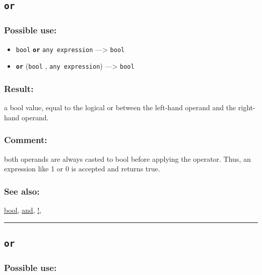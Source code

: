 \documentclass[]{book}
\providecommand{\tightlist}{%
  \setlength{\itemsep}{0pt}\setlength{\parskip}{0pt}}
\theoremstyle{definition}
\theoremstyle{definition}
\theoremstyle{definition}
\theoremstyle{remark}
\begin{document}
\subsection{\texorpdfstring{\texttt{or}}{or}}\label{or}

\subsubsection{Possible use:}\label{possible-use-385}

\begin{itemize}
\tightlist
\item
  \texttt{bool} \textbf{\texttt{or}} \texttt{any\ expression}
  ---\textgreater{} \texttt{bool}
\item
  \textbf{\texttt{or}} (\texttt{bool} , \texttt{any\ expression})
  ---\textgreater{} \texttt{bool}
\end{itemize}

\subsubsection{Result:}\label{result-371}

a bool value, equal to the logical or between the left-hand operand and
the right-hand operand.

\subsubsection{Comment:}\label{comment-75}

both operands are always casted to bool before applying the operator.
Thus, an expression like 1 or 0 is accepted and returns true.

\subsubsection{See also:}\label{see-also-152}

\href{OperatorsBC\#bool}{bool}, \href{OperatorsAA\#and}{and},
\href{OperatorsAA\#!}{!},

\begin{center}\rule{0.5\linewidth}{\linethickness}\end{center}

\subsection{\texorpdfstring{\texttt{or}}{or}}\label{or-1}

\subsubsection{Possible use:}\label{possible-use-386}
\end{document}
